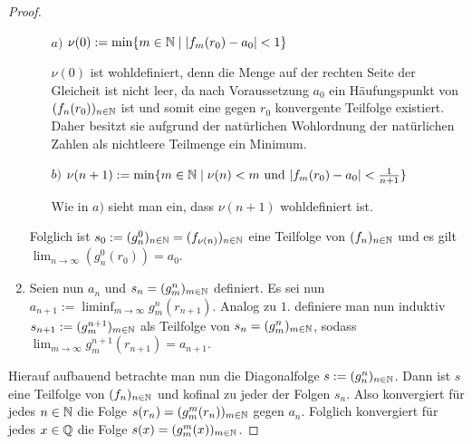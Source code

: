 \begin{proof}
\begin{enumerate}
\begin{itemize}
        \item[$a)$] $\nu(0) := \min\{m \in \mathbb{N} \mid |f_m(r_0) - a_0 | < 1\}$

          $\nu(0)$ ist wohldefiniert, denn die Menge auf der rechten Seite der Gleicheit ist nicht leer, da nach Voraussetzung $a_0$ ein Häufungspunkt von $(f_n(r_0))_{n \in \mathbb{N}}$ ist und somit eine gegen $r_0$ konvergente Teilfolge existiert.
          Daher besitzt sie aufgrund der natürlichen Wohlordnung der natürlichen Zahlen als nichtleere Teilmenge ein Minimum.

        \item[$b)$] $\nu(n+1) :=  \min\{m \in \mathbb{N} \mid \nu(n) < m \text{ und }  |f_m(r_0) - a_0| < \frac{1}{n+1}\}$

          Wie in $a)$ sieht man ein, dass $\nu(n+1)$ wohldefiniert ist.
      \end{itemize}
      Folglich ist $s_0:= (g_n^0)_{n \in \mathbb{N}} = (f_{\nu(n)})_{n \in \mathbb{N}}$ eine Teilfolge von $(f_n)_{n \in \mathbb{N}}$ und es gilt $\lim_{n \to \infty}(g_n^0(r_0)) = a_0$.

    \item 
      Seien nun $a_n$ und $s_n = (g_m^n)_{m \in \mathbb{N}}$ definiert.
      Es sei nun $a_{n + 1} := \liminf_{m \to \infty} g_m^n(r_{n+1})$.
      Analog zu $1.$ definiere man nun induktiv $s_{n+1} := (g_m^{n + 1})_{m \in \mathbb{N}}$ als Teilfolge von $s_n = (g_m^n)_{m \in \mathbb{N}}$, sodass $\lim_{m \to \infty} g_m^{n + 1}(r_{n+1}) = a_{n + 1}$.
  \end{enumerate}

  Hierauf aufbauend betrachte man nun die Diagonalfolge $s := (g_n^n)_{n \in \mathbb{N}}$.
  Dann ist $s$ eine Teilfolge von $(f_n)_{n \in \mathbb{N}}$ und kofinal zu jeder der Folgen $s_n$.
  Also konvergiert für jedes $n \in \mathbb{N}$ die Folge $s(r_n) = (g_m^m(r_n))_{m \in \mathbb{N}}$ gegen $a_n$.
  Folglich konvergiert für jedes $x \in \mathbb{Q}$ die Folge $s(x) = (g_m^m(x))_{m \in \mathbb{N}}$.


\end{proof}
